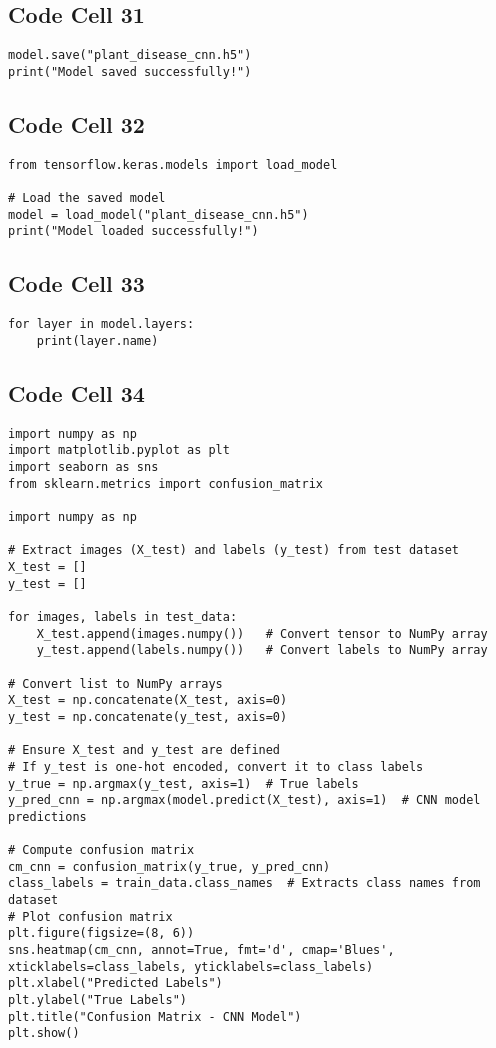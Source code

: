 \documentclass{article}
\begin{document}
\subsection*{Code Cell 31}
\begin{lstlisting}
model.save("plant_disease_cnn.h5")
print("Model saved successfully!")
\end{lstlisting}

\subsection*{Code Cell 32}
\begin{lstlisting}
from tensorflow.keras.models import load_model

# Load the saved model
model = load_model("plant_disease_cnn.h5")
print("Model loaded successfully!")
\end{lstlisting}

\subsection*{Code Cell 33}
\begin{lstlisting}
for layer in model.layers:
    print(layer.name)
\end{lstlisting}

\subsection*{Code Cell 34}
\begin{lstlisting}
import numpy as np
import matplotlib.pyplot as plt
import seaborn as sns
from sklearn.metrics import confusion_matrix

import numpy as np

# Extract images (X_test) and labels (y_test) from test dataset
X_test = []
y_test = []

for images, labels in test_data:
    X_test.append(images.numpy())   # Convert tensor to NumPy array
    y_test.append(labels.numpy())   # Convert labels to NumPy array

# Convert list to NumPy arrays
X_test = np.concatenate(X_test, axis=0)
y_test = np.concatenate(y_test, axis=0)

# Ensure X_test and y_test are defined
# If y_test is one-hot encoded, convert it to class labels
y_true = np.argmax(y_test, axis=1)  # True labels
y_pred_cnn = np.argmax(model.predict(X_test), axis=1)  # CNN model predictions

# Compute confusion matrix
cm_cnn = confusion_matrix(y_true, y_pred_cnn)
class_labels = train_data.class_names  # Extracts class names from dataset
# Plot confusion matrix
plt.figure(figsize=(8, 6))
sns.heatmap(cm_cnn, annot=True, fmt='d', cmap='Blues', xticklabels=class_labels, yticklabels=class_labels)
plt.xlabel("Predicted Labels")
plt.ylabel("True Labels")
plt.title("Confusion Matrix - CNN Model")
plt.show()
\end{lstlisting}
\end{document}
